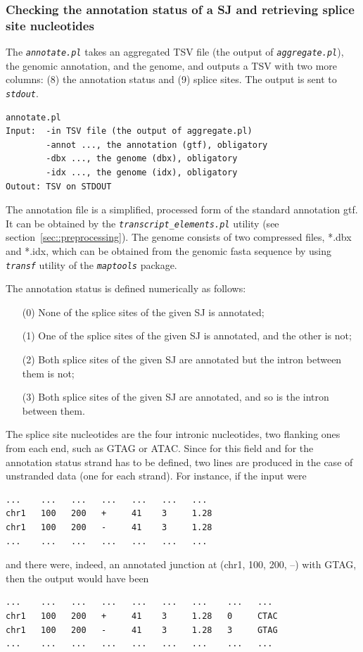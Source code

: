 \documentclass{article}
\newcommand{\prog}[1]{{\tt\em #1}}
\begin{document}

\subsubsection[Annotation status and splice site nucleotides]{Checking the annotation status of a SJ and retrieving splice site nucleotides}
\label{sec::annotation_status}
The \prog{annotate.pl} takes an aggregated TSV file (the output of \prog{aggregate.pl}), the genomic annotation, and the genome, and outputs a TSV 
with two more columns: (8) the annotation status and (9) splice sites. The output is sent to \prog{stdout}.
\begin{verbatim}
annotate.pl
Input:  -in TSV file (the output of aggregate.pl)
        -annot ..., the annotation (gtf), obligatory
        -dbx ..., the genome (dbx), obligatory
        -idx ..., the genome (idx), obligatory
Outout: TSV on STDOUT
\end{verbatim}
The annotation file is a simplified, processed form of the standard annotation gtf. It can be obtained by the \prog{transcript\_elements.pl} utility (see section~\ref{sec::preprocessing}).
The genome consists of two compressed files, *.dbx and *.idx, which can be obtained from the genomic fasta sequence by using \prog{transf} utility of the \prog{maptools} package. 

The annotation status is defined numerically as follows:
\begin{enumerate}
\item[(0)] None of the splice sites of the given SJ is annotated;
\item[(1)] One of the splice sites of the given SJ is annotated, and the other is not;
\item[(2)] Both splice sites of the given SJ are annotated but the intron between them is not;
\item[(3)] Both splice sites of the given SJ are annotated, and so is the intron between them.
\end{enumerate}

The splice site nucleotides are the four intronic nucleotides, two flanking ones from each end, such as GTAG or ATAC. Since for this field and for the annotation status strand 
has to be defined, two lines are produced in the case of unstranded data (one for each strand). For instance, if the input were
\begin{verbatim}
...    ...   ...   ...   ...   ...   ...
chr1   100   200   +     41    3     1.28
chr1   100   200   -     41    3     1.28
...    ...   ...   ...   ...   ...   ...
\end{verbatim}
and there were, indeed, an annotated junction at (chr1, 100, 200, --) with GTAG, then the output would have been
\begin{verbatim}
...    ...   ...   ...   ...   ...   ...    ...   ...
chr1   100   200   +     41    3     1.28   0     CTAC
chr1   100   200   -     41    3     1.28   3     GTAG
...    ...   ...   ...   ...   ...   ...    ...   ...
\end{verbatim}
\end{document}
